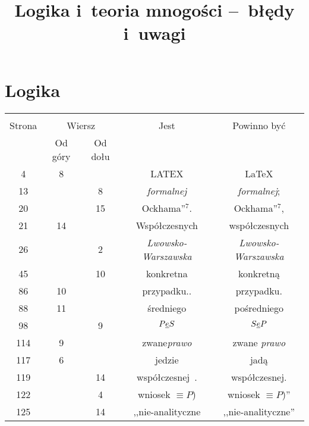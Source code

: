 \documentclass[a4paper,11pt]{article}
\title{Logika i~teoria mnogości --~błędy i~uwagi}
\begin{document}



\maketitle  %



\section{Logika}

\vspace{\spaceTwo}





\begin{center}
  \begin{tabular}{|c|c|c|c|c|}
    \hline
    & \multicolumn{2}{c|}{} & & \\
    Strona & \multicolumn{2}{c|}{Wiersz} & Jest
                              & Powinno być \\ \cline{2-3}
    & Od góry & Od dołu & & \\
    \hline
    4   &  8 & & LATEX & \LaTeX \\
    13  & &  8 & \emph{formalnej} & \emph{formalnej}; \\
    20  & & 15 & Ockhama''$^{ 7 }$. & Ockhama''$^{ 7 }$, \\
    21  & 14 & & Współczesnych & współczesnych \\
    26  & &  2 & \emph{Lwowsko-\! Warszawska} & \emph{Lwowsko-Warszawska} \\
    45  & & 10 & konkretna & konkretną \\
    86  & 10 & & przypadku.. & przypadku. \\
    88  & 11 & & średniego & pośredniego \\  %
    98  & &  9 & $P \underline{ e } S$ & $S \underline{ e } P$ \\
    114 &  9 & & zwane\emph{prawo} & zwane \emph{prawo} \\
    117 &  6 & & jedzie & jadą \\
    119 & & 14 & współczesnej~. & współczesnej. \\
    122 & &  4 & wniosek $\equiv P$) & wniosek $\equiv P$)'' \\
    125 & & 14 & ,,nie-analityczne  %
           & ,,nie-analityczne'' \\
    \hline
  \end{tabular}
\end{center}
\end{document}
